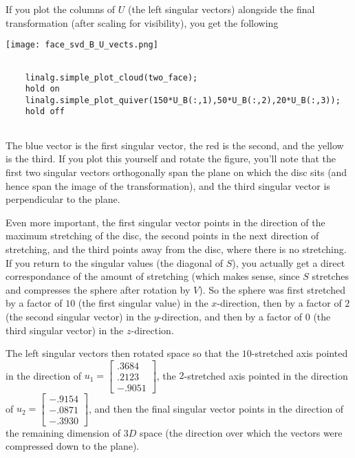 \documentclass{ximera}
\begin{document}
If you plot the columns of $U$ (the left singular vectors) alongside the final transformation (after scaling for visibility), you get the following 

\begin{center}
  \texttt{[image: face\_svd\_B\_U\_vects.png]}
\end{center}

\begin{hint}
  \begin{verbatim}

    linalg.simple_plot_cloud(two_face);
    hold on
    linalg.simple_plot_quiver(150*U_B(:,1),50*U_B(:,2),20*U_B(:,3));
    hold off
  
  \end{verbatim}
\end{hint}

The blue vector is the first singular vector, the red is the second, and the yellow is the third. If you plot this yourself and rotate the figure, you'll note that the first two singular vectors orthogonally span the plane on which the disc sits (and hence span the image of the transformation), and the third singular vector is perpendicular to the plane. 

\begin{remark}

Even more important, the first singular vector points in the direction of the maximum stretching of the disc, the second points in the next direction of stretching, and the third points away from the disc, where there is no stretching. If you return to the singular values (the diagonal of $S$), you actually get a direct correspondance of the amount of stretching (which makes sense, since $S$ stretches and compresses the sphere after rotation by $V$). So the sphere was first stretched by a factor of $10$ (the first singular value) in the $x$-direction, then by a factor of $2$ (the second singular vector) in the $y$-direction, and then by a factor of $0$ (the third singular vector) in the $z$-direction. 

The left singular vectors then rotated space so that the $10$-stretched axis pointed in the direction of $u_1=\begin{bmatrix}.3684\\.2123\\-.9051\end{bmatrix}$, the $2$-stretched axis pointed in the direction of $u_2=\begin{bmatrix}-.9154\\-.0871\\-.3930\end{bmatrix}$, and then the final singular vector points in the direction of the remaining dimension of $3D$ space (the direction over which the vectors were compressed down to the plane).

\end{remark}
\end{document}
